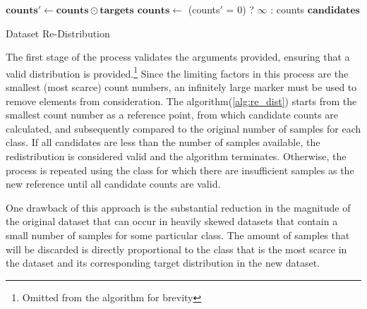 \documentclass[12pt, a4paper]{report}
\makeatletter
\theoremstyle{definition}
\theoremstyle{definition}%
\theoremstyle{definition}%
\theoremstyle{definition}%
\theoremstyle{definition}%
\theoremstyle{definition}%
\newcommand{\algorithmfootnote}[2][\footnotesize]{%
  \let\old@algocf@finish\@algocf@finish%
  \def\@algocf@finish{\old@algocf@finish%
    \leavevmode\rlap{\begin{minipage}{\linewidth}
    #1#2
    \end{minipage}}%
  }%
}
\makeatother
\begin{document}
\vspace{\baselineskip}
\begin{algorithm}[H]
	\SetAlgoLined
	\DontPrintSemicolon
	\algorithmfootnote{Ternary operations are applied element-wise}
	$\mathbf{counts'} \gets \mathbf{counts} \odot \mathbf{targets}$\;
	$\mathbf{counts} \gets$ (counts$'$ = 0) ? $\infty$ : counts\;  
	\Return $\mathbf{candidates}$
	\caption{Dataset Re-Distribution}
	\label{alg:re_dist}
\end{algorithm}
\vspace{\baselineskip}

The first stage of the process validates the arguments provided, ensuring that a valid distribution is provided.\footnote{Omitted from the algorithm for brevity} Since the limiting factors in this process are the smallest (most scarce) count numbers, an infinitely large marker must be used to remove elements from consideration. The algorithm(\ref{alg:re_dist}) starts from the smallest count number as a reference point, from which candidate counts are calculated, and subsequently compared to the original number of samples for each class. If all candidates are less than the number of samples available, the redistribution is considered valid and the algorithm terminates. Otherwise, the process is repeated using the class for which there are insufficient samples as the new reference until all candidate counts are valid.

One drawback of this approach is the substantial reduction in the magnitude of the original dataset that can occur in heavily skewed datasets that contain a small number of samples for some particular class. The amount of samples that will be discarded is directly proportional to the class that is the most scarce in the dataset and its corresponding target distribution in the new dataset.
\end{document}
